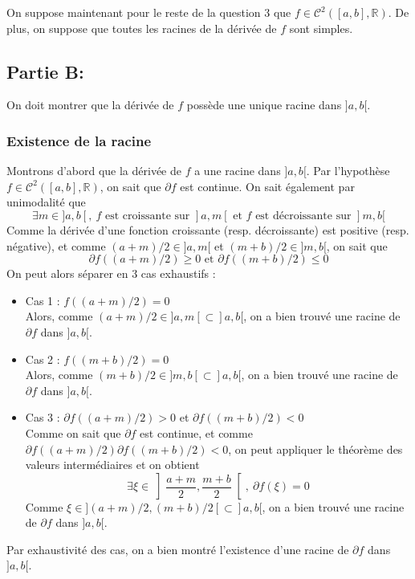 \documentclass[a4paper, 12pt]{article}
\begin{document}
\newpage

On suppose maintenant pour le reste de la question 3 que \( f \in \mathcal{C}^{2}([a, b], \mathbb{R}) \). De plus, on suppose que toutes les racines de la dérivée de \( f \) sont simples.

\subsection{Partie B:}

On doit montrer que la dérivée de \( f \) possède une unique racine dans \( ]a, b[ \).

\subsubsection{Existence de la racine}

Montrons d'abord que la dérivée de \( f \) a une racine dans \( ]a, b[ \). Par l'hypothèse \( f \in \mathcal{C}^{2}([a, b], \mathbb{R}) \), on sait que \( \partial f \) est continue.
On sait également par unimodalité que
$$
\exists m \in ]a, b[,~ f \text{ est croissante sur } ]a, m[ \text{ et } f \text{ est décroissante sur } ]m, b[
$$
Comme la dérivée d'une fonction croissante (resp. décroissante) est positive (resp. négative), et comme \( (a+m)/2 \in ]a, m[ \) et \( (m+b)/2 \in ]m, b[ \), on sait que
$$
\partial f ((a+m)/2) \geq 0 \text{ et } \partial f((m+b)/2) \leq 0
$$
On peut alors séparer en 3 cas exhaustifs :
\begin{itemize}
    \item Cas 1 : \( f ((a+m)/2) = 0 \) \\
    Alors, comme \( (a+m)/2 \in ]a, m[ \subset ]a, b[ \), on a bien trouvé une racine de \( \partial f \) dans \( ]a, b[ \).
    \item Cas 2 : \( f ((m+b)/2) = 0 \) \\
    Alors, comme \( (m+b)/2 \in ]m, b[ \subset ]a, b[ \), on a bien trouvé une racine de \( \partial f \) dans \( ]a, b[ \).
    \item Cas 3 : \( \partial f ((a+m)/2) > 0 \) et \( \partial f((m+b)/2) < 0 \) \\
    Comme on sait que \( \partial f \) est continue, et comme \( \partial f ((a+m)/2) \partial f((m+b)/2) < 0 \), on peut appliquer le théorème des valeurs intermédiaires et on obtient
    $$
    \exists \xi \in \left] \frac{a+m}{2}, \frac{m+b}{2} \right[,~ \partial f (\xi) = 0
    $$
    Comme \( \xi \in ](a+m)/2, (m+b)/2[ \subset ]a, b[ \), on a bien trouvé une racine de \( \partial f \) dans \( ]a, b[ \).
\end{itemize}
Par exhaustivité des cas, on a bien montré l'existence d'une racine de \( \partial f \) dans \( ]a, b[ \).
\end{document}

